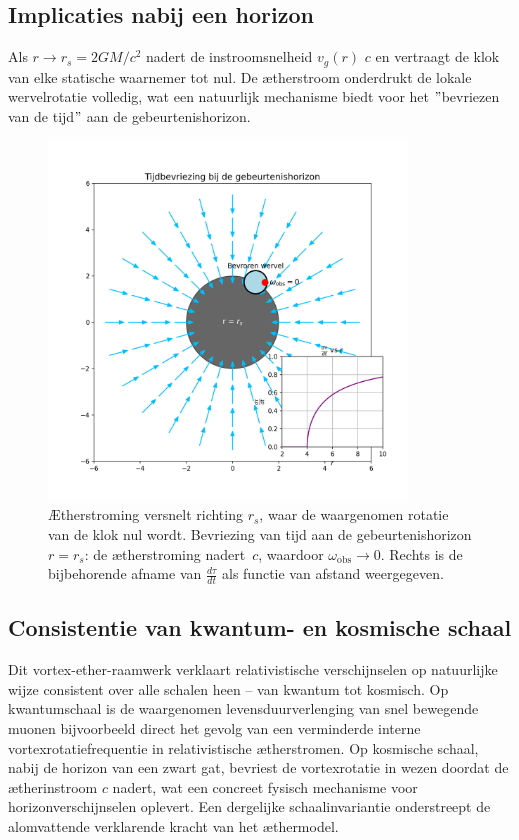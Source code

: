 \subsection*{Implicaties nabij een horizon}

Als $r \to r_s = 2GM/c^2$ nadert de instroomsnelheid $v_g(r)$ $c$ en vertraagt de klok van elke statische waarnemer tot nul. De ætherstroom onderdrukt de lokale wervelrotatie volledig, wat een natuurlijk mechanisme biedt voor het \("\)bevriezen van de tijd\("\) aan de gebeurtenishorizon.


\begin{figure}[htbp]
    \centering
    \includegraphics[width=0.85\textwidth]{10-HorizonTijdsbevriezing_nl}
    \caption{Ætherstroming versnelt richting $r_s$, waar de waargenomen rotatie van de klok nul wordt. Bevriezing van tijd aan de gebeurtenishorizon $r = r_s$: de ætherstroming nadert~$c$, waardoor $\omega_{\mathrm{obs}} \to 0$. Rechts is de bijbehorende afname van $\frac{d\tau}{dt}$ als functie van afstand weergegeven.}
    \label{fig:HorizonTijdsbevriezing}
\end{figure}

\subsection*{Consistentie van kwantum- en kosmische schaal}

Dit vortex-ether-raamwerk verklaart relativistische verschijnselen op natuurlijke wijze consistent over alle schalen heen – van kwantum tot kosmisch. Op kwantumschaal is de waargenomen levensduurverlenging van snel bewegende muonen bijvoorbeeld direct het gevolg van een verminderde interne vortexrotatiefrequentie in relativistische ætherstromen. Op kosmische schaal, nabij de horizon van een zwart gat, bevriest de vortexrotatie in wezen doordat de ætherinstroom $c$ nadert, wat een concreet fysisch mechanisme voor horizonverschijnselen oplevert. Een dergelijke schaalinvariantie onderstreept de alomvattende verklarende kracht van het æthermodel.

